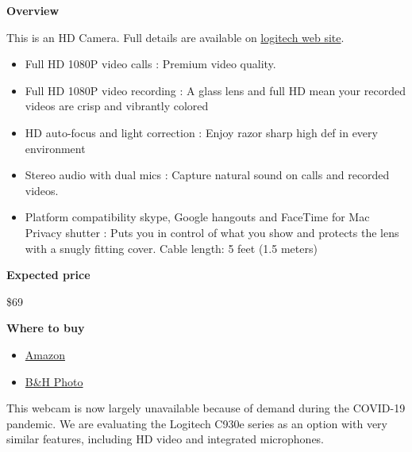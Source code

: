 \begin{gram}
\label{grm:equipment::logitech-920::main}
\textbf{Overview}

This is an HD Camera.  Full details are available on 
%
\href{https://www.logitech.com/en-us/product/hd-pro-webcam-c920s}{logitech web site}.
%
\begin{itemize}
\item
Full HD 1080P video calls : Premium video quality.
\item
Full HD 1080P video recording : A glass lens and full HD mean your recorded videos are crisp and vibrantly colored
\item
HD auto-focus and light correction : Enjoy razor sharp high def in every environment

\item
Stereo audio with dual mics : Capture natural sound on calls and recorded videos. 

\item 
Platform compatibility skype, Google hangouts and FaceTime for Mac
Privacy shutter : Puts you in control of what you show and protects the lens with a snugly fitting cover. Cable length: 5 feet (1.5 meters)
\end{itemize}


\textbf{Expected price}

\$69

\textbf{Where to buy}

\begin{itemize}
\item
\href{https://www.amazon.com/Logitech-Widescreen-Calling-Recording-Desktop/dp/B006JH8T3S/ref=sr_1_2?crid=2T6CQ3HNRR1XR&keywords=logitech+c920&qid=1582900645&s=electronics&sprefix=logitech+c,electronics,172&sr=1-2}{Amazon}
\item
\href{https://www.bhphotovideo.com/c/product/1461727-REG/logitech_960_001257_c920s_hd_pro_webcam.html}{B\&H Photo}
\end{itemize}

This webcam is now largely unavailable because of demand during the
COVID-19 pandemic. We are evaluating the Logitech C930e series as an
option with very similar features, including HD video and integrated
microphones.
\end{gram}

